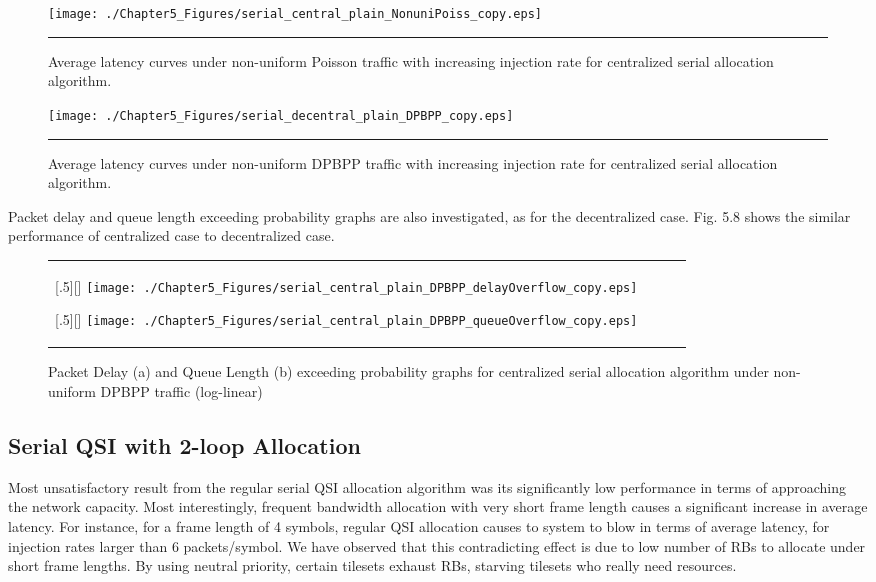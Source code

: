 \begin{figure}[htbp]
  \centering
    \texttt{[image: ./Chapter5\_Figures/serial\_central\_plain\_NonuniPoiss\_copy.eps]}
    \rule{35em}{0.5pt}
  \caption[Centralized Serial Allocation Average latency under non-uniform Poisson]{Average latency curves under non-uniform Poisson traffic with increasing injection rate for centralized serial allocation algorithm.}
  \label{fig:Electron}
\end{figure}


\begin{figure}[htbp]
  \centering
    \texttt{[image: ./Chapter5\_Figures/serial\_decentral\_plain\_DPBPP\_copy.eps]}
    \rule{35em}{0.5pt}
  \caption[Centralized Serial Allocation Average latency under non-uniform DPBPP]{Average latency curves under non-uniform DPBPP traffic with increasing injection rate for centralized serial allocation algorithm.}
  \label{fig:Electron}
\end{figure}


Packet delay and queue length exceeding probability graphs are also investigated, as for the decentralized case. Fig. 5.8 shows the similar performance of centralized case to decentralized case. 

\begin{figure*}[htbp]
  \centering
  \begin{tabular}[c]{cccc}

  \subcaptionbox{}[.5\linewidth][]{%
    \texttt{[image: ./Chapter5\_Figures/serial\_central\_plain\_DPBPP\_delayOverflow\_copy.eps]} }	
    
  \subcaptionbox{}[.5\linewidth][]{%
    \texttt{[image: ./Chapter5\_Figures/serial\_central\_plain\_DPBPP\_queueOverflow\_copy.eps]}}
 
   \end{tabular}

  \caption{Packet Delay (a) and Queue Length (b) exceeding probability graphs for centralized serial allocation algorithm under non-uniform DPBPP traffic (log-linear)}
\end{figure*}

\subsection{Serial QSI with 2-loop Allocation}

Most unsatisfactory result from the regular serial QSI allocation algorithm was its significantly low performance in terms of approaching the network capacity. Most interestingly, frequent bandwidth allocation with very short frame length causes a significant increase in average latency. For instance, for a frame length of 4 symbols, regular QSI allocation causes to system to blow in terms of average latency, for injection rates larger than 6 packets/symbol. We have observed that this contradicting effect is due to low number of RBs to allocate under short frame lengths. By using neutral priority, certain tilesets exhaust RBs, starving tilesets who really need resources.  

